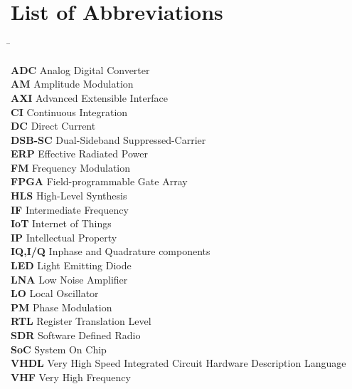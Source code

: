 \chapter{List of Abbreviations}
\label{cha:listabbrev}

\begin{tabbing}
\hspace{25 mm}\=\kill

\textbf{ADC}       \> Analog Digital Converter\\
\textbf{AM}        \> Amplitude Modulation\\
\textbf{AXI}       \> Advanced Extensible Interface\\
\textbf{CI}        \> Continuous Integration\\
\textbf{DC}        \> Direct Current\\
\textbf{DSB-SC}    \> Dual-Sideband Suppressed-Carrier\\
\textbf{ERP}       \> Effective Radiated Power\\
\textbf{FM}        \> Frequency Modulation\\
\textbf{FPGA}      \> Field-programmable Gate Array\\
\textbf{HLS}       \> High-Level Synthesis\\
\textbf{IF}        \> Intermediate Frequency\\
\textbf{IoT}       \> Internet of Things\\
\textbf{IP}        \> Intellectual Property\\
\textbf{IQ,I/Q}    \> Inphase and Quadrature components\\
\textbf{LED}       \> Light Emitting Diode\\
\textbf{LNA}       \> Low Noise Amplifier\\
\textbf{LO}        \> Local Oscillator\\
\textbf{PM}        \> Phase Modulation\\
\textbf{RTL}       \> Register Translation Level\\
\textbf{SDR}       \> Software Defined Radio\\
\textbf{SoC}       \> System On Chip\\
\textbf{VHDL}      \> Very High Speed Integrated Circuit Hardware Description Language\\
\textbf{VHF}       \> Very High Frequency\\

\end{tabbing}
